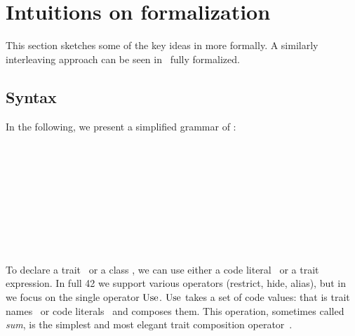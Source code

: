\saveSpace\saveSpace\section{Intuitions on formalization}\label{sec:formal}
\saveSpace\saveSpace

This section sketches some of the key ideas in \name more
formally. A similarly interleaving approach can be seen in~\cite{servetto2014meta} fully formalized.


\subsection{Syntax}

In the following, we present a simplified grammar of \name:

\begin{bnf}
\prodFull{}\\
\prodFull{}\\
\prodFull{}\\
\prodFull{}\\
\prodFull{}\\
\prodFull{}\\

\prodFull{}\\
\prodFull{}\\
\end{bnf}

\noindent To declare a trait \mTD\ or a class \mCD, we can use either a code literal \mL\ or a trait
expression.  In full 42 we support various operators (restrict, hide,
alias), but in \name we focus on the single operator 
$\use$. $\use$ takes a set
of code values: that is trait names \mt\ or code literals \mL\ and composes them.  This operation, sometimes called \emph{sum}, is the simplest and most elegant
trait composition operator~\cite{ducasse2006traits}.


